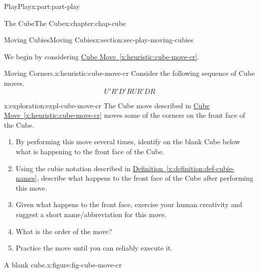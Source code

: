 \documentclass[oneside,10pt,]{book}
\newcommand{\xreffont}{\relax}
\numberwithin{equation}{section}
\begin{document}
\begin{partptx}{Play}{}{Play}{}{}{x:part:part-play}
\begin{chapterptx}{The Cube}{}{The Cube}{}{}{x:chapter:chap-cube}
\begin{sectionptx}{Moving Cubies}{}{Moving Cubies}{}{}{x:section:sec-play-moving-cubies}
\begin{introduction}{}
\end{introduction}%
We begin by considering \hyperref[x:heuristic:cube-move-cr]{Cube Move~{\xreffont\ref{x:heuristic:cube-move-cr}}}.%
\begin{heuristic}{Moving Corners.}{}{x:heuristic:cube-move-cr}%
Consider the following sequence of Cube moves.%
%
\begin{equation*}
U' R' D' R U R' D R
\end{equation*}
\end{heuristic}
\begin{exploration}{}{x:exploration:expl-cube-move-cr}%
The Cube move described in \hyperref[x:heuristic:cube-move-cr]{Cube Move~{\xreffont\ref{x:heuristic:cube-move-cr}}} moves some of the corners on the front face of the Cube.%
%
\begin{enumerate}
\item{}By performing this move several times, identify on the blank Cube below what is happening to the front face of the Cube.%
\item{}Using the cubie notation described in \hyperref[x:definition:def-cubie-names]{Definition~{\xreffont\ref{x:definition:def-cubie-names}}}, describe what happens to the front face of the Cube after performing this move.%
\item{}Given what happens to the front face, exercise your human creativity and suggest a short name\slash{}abbreviation for this move.%
\item{}What is the order of the move?%
\item{}Practice the move until you can reliably execute it.%
\end{enumerate}
\begin{figureptx}{A blank cube.}{x:figure:fig-cube-move-cr}{}%
\begin{image}{0.25}{0.5}{0.25}%

\end{image}
\end{figureptx}
\end{exploration}
\end{sectionptx}
\end{chapterptx}
\end{partptx}
\end{document}
